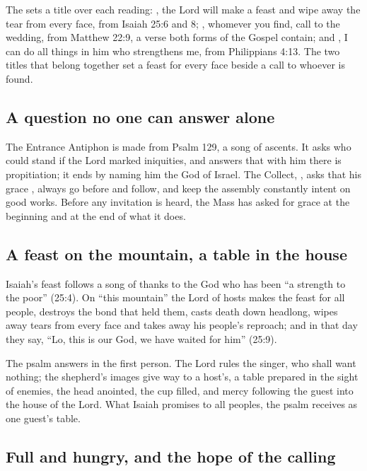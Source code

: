 The  sets a title over each reading:
, the Lord
will make a feast and wipe away the tear from every face, from Isaiah 25:6 and
8; , whomever you find, call
to the wedding, from Matthew 22:9, a verse both forms of the Gospel contain;
and , I can do all things in him
who strengthens me, from Philippians 4:13. The two titles that belong together
set a feast for every face beside a call to whoever is found.

\subsection{A question no one can answer alone}

The Entrance Antiphon is made from Psalm 129, a song of ascents. It asks who
could stand if the Lord marked iniquities, and answers that with him there is
propitiation; it ends by naming him the God of Israel. The Collect, , asks that his grace , always go before and follow, and keep the assembly
constantly intent on good works. Before any invitation is heard, the Mass has
asked for grace at the beginning and at the end of what it does.

\subsection{A feast on the mountain, a table in the house}

Isaiah's feast follows a song of thanks to the God who has been ``a strength
to the poor'' (25:4). On ``this mountain'' the Lord of hosts makes the feast
for all people, destroys the bond that held them, casts death down headlong,
wipes away tears from every face and takes away his people's reproach; and in
that day they say, ``Lo, this is our God, we have waited for him'' (25:9).

The psalm answers in the first person. The Lord rules the singer, who shall
want nothing; the shepherd's images give way to a host's, a table prepared in
the sight of enemies, the head anointed, the cup filled, and mercy following
the guest into the house of the Lord. What Isaiah promises to all peoples, the
psalm receives as one guest's table.

\subsection{Full and hungry, and the hope of the calling}

